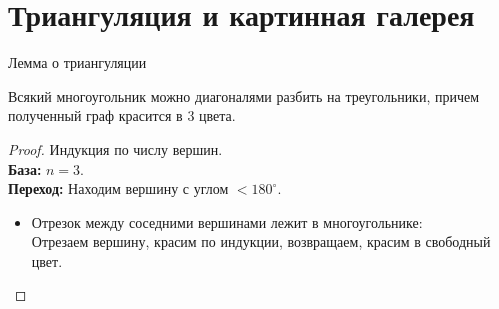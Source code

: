    \section{Триангуляция и картинная галерея}

    \begin{frame}{Лемма о триангуляции}

    \vspace{2mm}
    \begin{lm}[О триангуляции]\hypertarget{trianglemm}{}

        Всякий многоугольник можно диагоналями разбить на треугольники, причем полученный граф красится в 3 цвета.

    \end{lm}

    \begin{proof}\let\qed\relax
        Индукция по числу вершин.\\

        \textbf{База:} $n = 3$.\\
        \textbf{Переход:} Находим вершину с  углом $<180^{\circ}$.\\

        \begin{itemize}

            \item Отрезок между соседними  вершинами лежит в многоугольнике:\\
            Отрезаем вершину, красим по индукции, возвращаем, красим в свободный цвет.

        \end{itemize}

    \end{proof}

    \end{frame}

